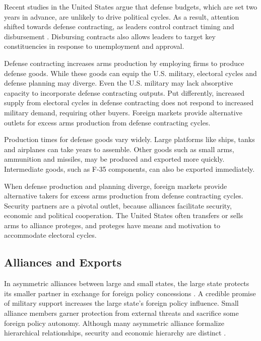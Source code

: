 \documentclass[12pt]{article}
\begin{document}
Recent studies in the United States argue that defense budgets, which are set two years in advance, are unlikely to drive political cycles.
As a result, attention shifted towards defense contracting, as leaders control contract timing and disbursement \citep{Mayer1995, DerouenHeo2000}.
Disbursing contracts also allows leaders to target key constituencies in response to unemployment and approval.


Defense contracting increases arms production by employing firms to produce defense goods. 
While these goods can equip the U.S. military, electoral cycles and defense planning may diverge.
Even the U.S. military may lack absorptive capacity to incorporate defense contracting outputs.
Put differently, increased supply from electoral cycles in defense contracting does not respond to increased military demand, requiring other buyers. 
Foreign markets provide alternative outlets for excess arms production from defense contracting cycles. 


Production times for defense goods vary widely.
Large platforms like ships, tanks and airplanes can take years to assemble. 
Other goods such as small arms, ammunition and missiles, may be produced and exported more quickly. 
Intermediate goods, such as F-35 components, can also be exported immediately. 


When defense production and planning diverge, foreign markets provide alternative takers for excess arms production from defense contracting cycles. 
Security partners are a pivotal outlet, because alliances facilitate security, economic and political cooperation.
The United States often transfers or sells arms to alliance proteges, and proteges have means and motivation to accommodate electoral cycles. 



\subsection{Alliances and Exports}


In asymmetric alliances between large and small states, the large state protects its smaller partner in exchange for foreign policy concessions \citep{Morrow1991}.
A credible promise of military support increases the large state's foreign policy influence. 
Small alliance members garner protection from external threats and sacrifice some foreign policy autonomy. 
Although many asymmetric alliance formalize hierarchical relationships, security and economic hierarchy are distinct \citep{Lake2009}. 
\end{document}
